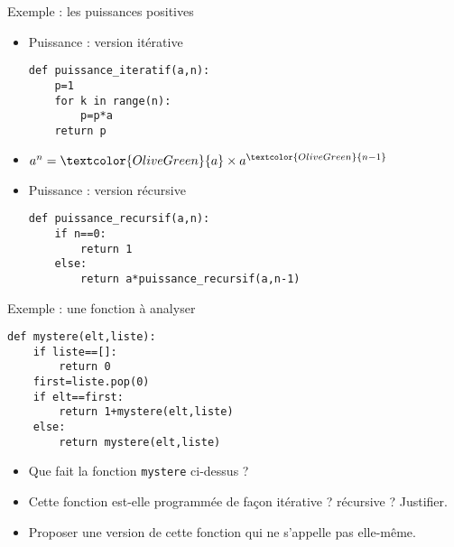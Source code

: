 \documentclass[10pt]{beamer}
\begin{document}
\begin{frame}[fragile]
	\mframe{\Recursivite}
	\begin{exampleblock}{Exemple : les puissances positives}
		\begin{itemize}[label=\textbullet]
			\item<1-> \textcolor{OliveGreen}{Puissance : version itérative}
			      \begin{lstlisting}
def puissance_iteratif(a,n):
    p=1
    for k in range(n):
        p=p*a
    return p
\end{lstlisting}
			\item<2-> $a^n = \textcolor{OliveGreen}{a} \times a^{\textcolor{OliveGreen}{n-1}}$
			\item<3-> \textcolor{OliveGreen}{Puissance : version récursive}
			      \begin{lstlisting}
def puissance_recursif(a,n):
    if n==0:
        return 1
    else:
        return a*puissance_recursif(a,n-1)
\end{lstlisting}
		\end{itemize}
	\end{exampleblock}
\end{frame}


\begin{frame}[fragile]
	\mframe{\Recursivite}
	\begin{exampleblock}{Exemple : une fonction à analyser}
		\begin{lstlisting}
def mystere(elt,liste):
    if liste==[]:
        return 0
    first=liste.pop(0)
    if elt==first:
        return 1+mystere(elt,liste)
    else:
        return mystere(elt,liste)
\end{lstlisting}
		\begin{itemize}[label=\textbullet]
			\item<2-> Que fait la fonction {\tt mystere} ci-dessus ?
			\item<3-> Cette fonction est-elle programmée de façon itérative ? récursive ? Justifier.
			\item<4-> Proposer une version de cette fonction qui ne s'appelle pas elle-même.
		\end{itemize}
	\end{exampleblock}
\end{frame}
\end{document}
